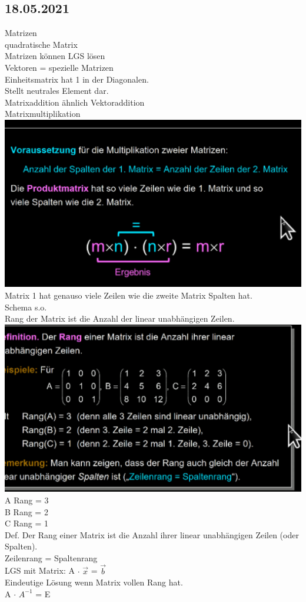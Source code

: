 \documentclass{article}
\begin{document}
	\subsection*{18.05.2021}
	Matrizen \\
	quadratische Matrix \\
	Matrizen können LGS lösen \\
	Vektoren = spezielle Matrizen \\
	Einheitsmatrix hat 1 in der Diagonalen. \\
	Stellt neutrales Element dar. \\
	Matrixaddition ähnlich Vektoraddition \\
	Matrixmultiplikation \\
	\includegraphics[width=\linewidth]{mat}
	Matrix 1 hat genauso viele Zeilen wie die zweite Matrix Spalten hat. \\
	Schema s.o. \\
	Rang der Matrix ist die Anzahl der linear unabhängigen Zeilen. \\
	\includegraphics[width=\linewidth]{rang} \\
	A Rang = 3 \\
	B Rang = 2 \\
	C Rang = 1 \\
	Def. Der Rang einer Matrix ist die Anzahl ihrer linear unabhängigen Zeilen (oder Spalten).  \\
	Zeilenrang = Spaltenrang \\
	LGS mit Matrix: A $\cdot$ $\vec{x}$ = $\vec{b}$ \\
	Eindeutige Lösung wenn Matrix vollen Rang hat. \\
	A $\cdot$ $A^{-1}$ = E \\
\end{document}
